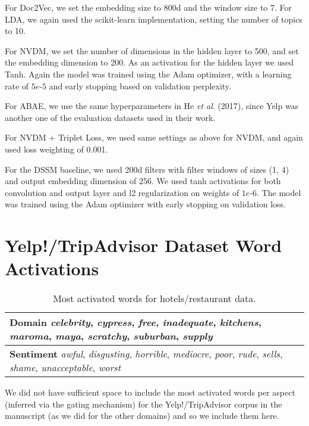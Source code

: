 \documentclass[11pt,a4paper]{article}
\begin{document}
For Doc2Vec, we set the embedding size to 800d and the window size to 7. For LDA, we again used the scikit-learn implementation, setting the number of topics to 10. %

For NVDM, we set the number of dimensions in the hidden layer to 500, and set the embedding dimension to 200. As an activation for the hidden layer we used Tanh. Again the model was trained using the Adam optimizer, with a learning rate of $5e$-$5$ and early stopping based on validation perplexity. %

For ABAE, we use the same hyperparameters in He \emph{et al}. (2017), since Yelp was another one of the evaluation datasets used in their work.

For NVDM + Triplet Loss, we used same settings as above for NVDM, and again used loss weighting of 0.001. %

For the DSSM baseline, we used 200d filters with filter windows of sizes (1, 4) and output embedding dimension of 256. We used tanh activations for both convolution and output layer and l2 regularization on weights of $1e$-$6$. The model was trained using the Adam optimizer with early stopping on validation loss.

\section{Yelp!/TripAdvisor Dataset Word Activations}
\begin{table}[h]
\centering
\begin{tabularx}{\columnwidth}{X}
\textbf{Domain} \emph{celebrity}, \emph{cypress}, \emph{free}, \emph{inadequate}, \emph{kitchens}, \emph{maroma}, \emph{maya}, \emph{scratchy}, \emph{suburban}, \emph{supply} \\\hline 
\textbf{Sentiment} \emph{awful}, \emph{disgusting}, \emph{horrible}, \emph{mediocre}, \emph{poor}, \emph{rude}, \emph{sells}, \emph{shame}, \emph{unacceptable}, \emph{worst} \\ %
\end{tabularx}
\caption{Most activated words for hotels/restaurant data.}
\label{table:foodmost}
\end{table}

We did not have sufficient space to include the most activated words per aspect (inferred via the gating mechanism) for the Yelp!/TripAdvisor corpus in the manuscript (as we did for the other domains) and so we include them here. 
\end{document}
